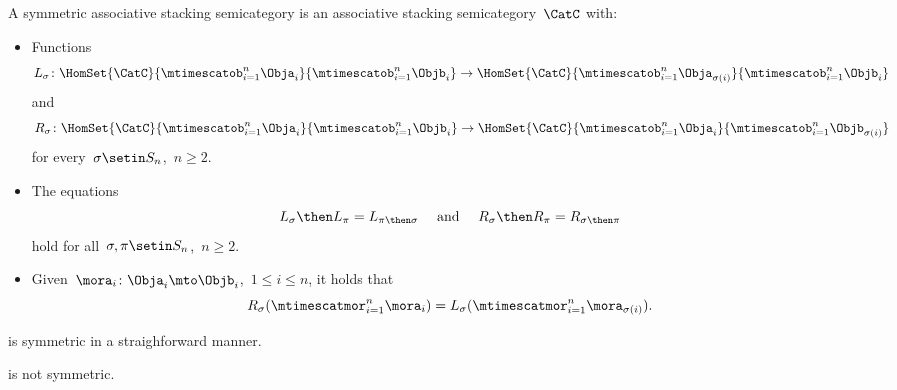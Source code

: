 \begin{ctdefinition}
    \label{def:symmetric-stacking-category}
    A symmetric associative stacking semicategory is an associative stacking semicategory~$\CatC$ with:

    \constit

    \begin{itemize}
        \item Functions
              \begin{equation}
                  L_\sigma \colon \HomSet{\CatC}{\mtimescatob_{i=1}^n \Obja_i}{\mtimescatob_{i=1}^n \Objb_i} \to \HomSet{\CatC}{\mtimescatob_{i=1}^n \Obja_{\sigma(i)}}{\mtimescatob_{i=1}^n \Objb_i}
              \end{equation}
              and
              \begin{equation}
                  R_\sigma \colon \HomSet{\CatC}{\mtimescatob_{i=1}^n \Obja_i}{\mtimescatob_{i=1}^n \Objb_i} \to \HomSet{\CatC}{\mtimescatob_{i=1}^n \Obja_i}{\mtimescatob_{i=1}^n \Objb_{\sigma(i)}}
              \end{equation}
              for every~$\sigma \setin S_n$,~$n \geq 2$.
    \end{itemize}

    \condit

    \begin{itemize}
        \item The equations
              \begin{equation}
                  L_\sigma \then L_\pi = L_{\pi \then \sigma}
                  \quad \text{ and } \quad
                  R_\sigma \then R_\pi = R_{\sigma \then \pi}
              \end{equation}
              hold for all~$\sigma, \pi \setin S_n$,~$n \geq 2$.
        \item
              Given~$\mora_i \colon \Obja_i \mto \Objb_i$,~$1 \leq i \leq n$, it holds that
              \begin{equation}
                  R_\sigma ( \mtimescatmor_{i=1}^n \mora_i ) = L_\sigma(  \mtimescatmor_{i=1}^n \mora_{\sigma(i)} ).
              \end{equation}

    \end{itemize}
\end{ctdefinition}


\begin{example}
    \SetL is symmetric in a straighforward manner.
\end{example}

\begin{lemma}
    \Effects is not symmetric.
\end{lemma}

